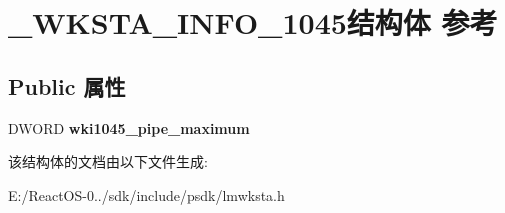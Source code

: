 \hypertarget{struct___w_k_s_t_a___i_n_f_o__1045}{}\section{\+\_\+\+W\+K\+S\+T\+A\+\_\+\+I\+N\+F\+O\+\_\+1045结构体 参考}
\label{struct___w_k_s_t_a___i_n_f_o__1045}
\subsection*{Public 属性}
\begin{DoxyCompactItemize}
\item 
\mbox{\label{struct___w_k_s_t_a___i_n_f_o__1045_a0ba012422695ce5a1b488b83b5f2cc6f}} 
D\+W\+O\+RD {\bfseries wki1045\+\_\+pipe\+\_\+maximum}
\end{DoxyCompactItemize}


该结构体的文档由以下文件生成\+:\begin{DoxyCompactItemize}
\item 
E\+:/\+React\+O\+S-\/0../sdk/include/psdk/lmwksta.\+h\end{DoxyCompactItemize}
